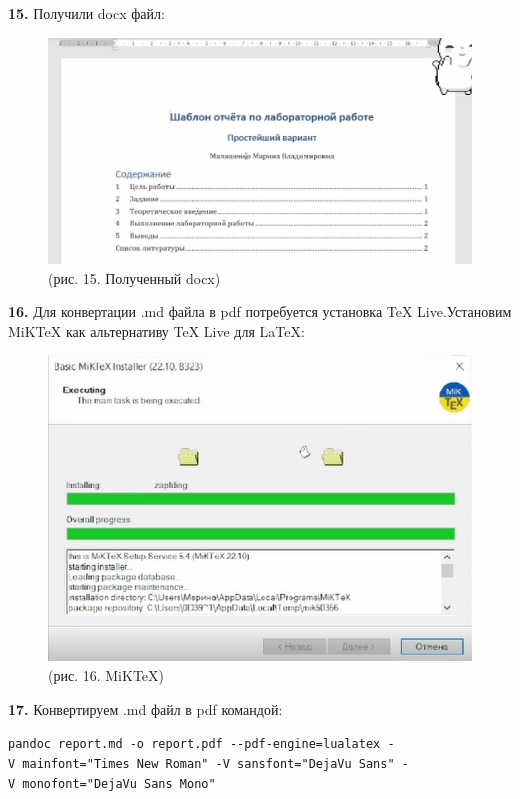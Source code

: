 \documentclass[
  12pt,
  a4paper,
]{scrreprt}
\begin{document}
\textbf{15.} Получили docx файл:

\begin{figure}
\centering
\includegraphics{./tex2pdf.-cbf55669a78d292a/image/15.PNG}
\caption{(рис. 15. Полученный docx)}
\end{figure}

\textbf{16.} Для конвертации .md файла в pdf потребуется установка TeX
Live.Установим MiKTeX как альтернативу TeX Live для LaTeX:

\begin{figure}
\centering
\includegraphics{./tex2pdf.-cbf55669a78d292a/image/16.PNG}
\caption{(рис. 16. MiKTeX)}
\end{figure}

\textbf{17.} Конвертируем .md файл в pdf командой:

\texttt{pandoc\ report.md\ -o\ report.pdf\ -\/-pdf-engine=lualatex\ -V\ mainfont="Times\ New\ Roman"\ -V\ sansfont="DejaVu\ Sans"\ -V\ monofont="DejaVu\ Sans\ Mono"}
\end{document}
